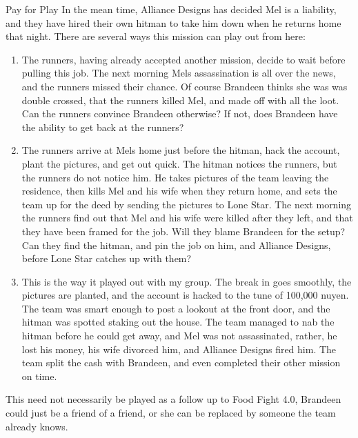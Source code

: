 \begin{scenario}{Pay for Play}
In the mean time, Alliance Designs has decided Mel is a liability, and they have hired their own hitman to take him down when he returns home that night. There are several ways this mission can play out from here:

\begin{enumerate}

\item The runners, having already accepted another mission, decide to wait before pulling this job. The next morning Mels assassination is all over the news, and the runners missed their chance. Of course Brandeen thinks she was was double crossed, that the runners killed Mel, and made off with all the loot. Can the runners convince Brandeen otherwise? If not, does Brandeen have the ability to get back at the runners?

\item The runners arrive at Mels home just before the hitman, hack the account, plant the pictures, and get out quick. The hitman notices the runners, but the runners do not notice him. He takes pictures of the team leaving the residence, then kills Mel and his wife when they return home, and sets the team up for the deed by sending the pictures to Lone Star. The next morning the runners find out that Mel and his wife were killed after they left, and that they have been framed for the job. Will they blame Brandeen for the setup? Can they find the hitman, and pin the job on him, and Alliance Designs, before Lone Star catches up with them?

\item This is the way it played out with my group. The break in goes smoothly, the pictures are planted, and the account is hacked to the tune of 100,000 nuyen. The team was smart enough to post a lookout at the front door, and the hitman was spotted staking out the house. The team managed to nab the hitman before he could get away, and Mel was not assassinated, rather, he lost his money, his wife divorced him, and Alliance Designs fired him. The team split the cash with Brandeen, and even completed their other mission on time.

\end{enumerate}

\notes This need not necessarily be played as a follow up to Food Fight 4.0, Brandeen could just be a friend of a friend, or she can be replaced by someone the team already knows. 

\end{scenario}